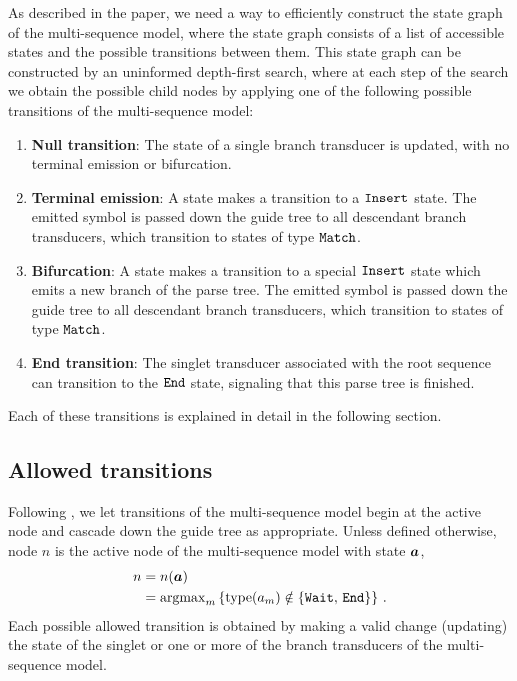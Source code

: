 \documentclass[10pt]{article}
\begin{document}
As described in the paper,
we need a way to efficiently construct the state graph of the multi-sequence model,
where the state graph consists of a list of accessible states and the possible transitions between them.
This state graph can be constructed by an uninformed depth-first search,
where at each step of the search we obtain the possible child nodes 
by applying one of the following possible transitions of the multi-sequence model:
\begin{enumerate}
\item {\bf Null transition}:
  The state of a single branch transducer is updated, with no terminal emission or bifurcation.
\item {\bf Terminal emission}:
  A state makes a transition to a $\mathtt{Insert}$ state.  The emitted symbol is passed down the guide
  tree to all descendant branch transducers, which transition to states of type $\mathtt{Match}$.
\item {\bf Bifurcation}:
  A state makes a transition to a special $\mathtt{Insert}$ state which emits a new branch of the parse tree.
  The emitted symbol is passed down the guide tree to all descendant branch transducers, 
  which transition to states of type $\mathtt{Match}$.
\item {\bf End transition}:
  The singlet transducer associated with the root sequence can transition to the $\mathtt{End}$ state,
  signaling that this parse tree is finished.
\end{enumerate}

Each of these transitions is explained in detail in the following section.



\subsection{Allowed transitions} 

Following \cite{Holmes2003},  we let transitions of the multi-sequence model begin at the active node and cascade down the guide tree
as appropriate.  Unless defined otherwise, node $n$ is the active node of the multi-sequence model with state $\boldsymbol{a}$, 
\begin{align}
  n &= n(\boldsymbol{a}) \\
  &= \mathrm{argmax}_m \left\{\operatorname{type}(a_m) \notin \{\mathtt{Wait},\,\mathtt{End}\}\right\} \, . \label{eqn:activenode} 
\end{align}
Each possible allowed transition is obtained by making a valid change (updating) the 
state of the singlet or one or more of the branch transducers of the multi-sequence model.
\end{document}
